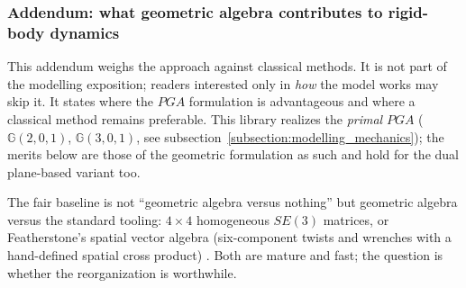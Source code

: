 \subsubsection[Addendum: what geometric algebra contributes]{Addendum: what geometric algebra contributes to rigid-body dynamics}
\label{subsubsection:addendum_ga_contribution}

This addendum weighs the approach against classical methods. It is not
part of the modelling exposition; readers interested only in \emph{how} the model works
may skip it. It states where the $PGA$ formulation is advantageous and where a classical
method remains preferable. This library realizes
the \emph{primal} $PGA$ ($\mathbb{G}(2,0,1)$, $\mathbb{G}(3,0,1)$, see
subsection~\ref{subsection:modelling_mechanics}); the merits below are those of the
geometric formulation as such and hold for the dual plane-based variant too.

The fair baseline is not ``geometric algebra versus nothing'' but geometric algebra versus
the standard tooling: $4\times4$ homogeneous $SE(3)$ matrices, or Featherstone's spatial
vector algebra (six-component twists and wrenches with a hand-defined spatial cross
product) \cite{Featherstone_rigid_body_dynamics:2008}. Both are mature and fast; the
question is whether the reorganization is worthwhile.


